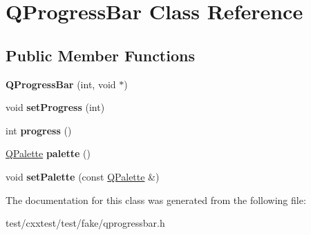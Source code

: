 \hypertarget{classQProgressBar}{\section{Q\-Progress\-Bar Class Reference}
\label{classQProgressBar}
}
\subsection*{Public Member Functions}
\begin{DoxyCompactItemize}
\item 
\hypertarget{classQProgressBar_ac0781b6c326609c47dc21c3dd0adc149}{{\bfseries Q\-Progress\-Bar} (int, void $\ast$)}\label{classQProgressBar_ac0781b6c326609c47dc21c3dd0adc149}

\item 
\hypertarget{classQProgressBar_aad4b2996d4fc515a955f8e2b52bca7be}{void {\bfseries set\-Progress} (int)}\label{classQProgressBar_aad4b2996d4fc515a955f8e2b52bca7be}

\item 
\hypertarget{classQProgressBar_af7ec01a130bd341b1bb4bb76bf54ca20}{int {\bfseries progress} ()}\label{classQProgressBar_af7ec01a130bd341b1bb4bb76bf54ca20}

\item 
\hypertarget{classQProgressBar_abaa5499725826e0d95ac96506de575be}{\hyperlink{classQPalette}{Q\-Palette} {\bfseries palette} ()}\label{classQProgressBar_abaa5499725826e0d95ac96506de575be}

\item 
\hypertarget{classQProgressBar_a6640f63512d20e74a49164c32d74e92e}{void {\bfseries set\-Palette} (const \hyperlink{classQPalette}{Q\-Palette} \&)}\label{classQProgressBar_a6640f63512d20e74a49164c32d74e92e}

\end{DoxyCompactItemize}


The documentation for this class was generated from the following file\-:\begin{DoxyCompactItemize}
\item 
test/cxxtest/test/fake/qprogressbar.\-h\end{DoxyCompactItemize}
